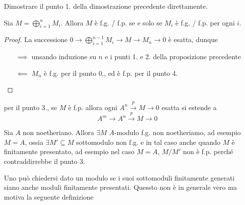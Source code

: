 \begin{eser}{}
    Dimostrare il punto 1. della dimostrazione precedente direttamente.
\end{eser}
\begin{corollary}{}
    Sia \(M = \bigoplus_{i=1}^{n} M_i \). Allora \(M\) è f.g. / f.p. se e solo
    se \(M_{i} \) è f.g. / f.p. per ogni \(i\).
\end{corollary}
\begin{proof}{}
    La successione \(0 \to \bigoplus_{i=1} ^{n-1}M_i \to M \to M_{n} \to 0\) è
    esatta, dunque
    \begin{itemize}
        \item[\(\implies \)] unsando induzione su \(n\) e i punti 1. e 2. della
            proposizione precedente
        \item[\(\impliedby \)] \(M_n\) è f.g. per il punto 0., ed è f.p. per il
            punto 4.
    \end{itemize}
\end{proof}
\begin{remark}{}
    per il punto 3., se \(M\) è f.p. allora ogni \(A^{n} \overset{p}{\to } M \to 0\) esatta si estende a 
    \[
      A^{m} \to A^{n} \overset{p}{\to } M \to 0
    \]
\end{remark}

\begin{remark}{}
    Sia \(A\) non noetheriano. Allora \(\exists M\) \(A\)-modulo f.g. non
    noetheriamo, ad esempio \(M = A\), ossia \(\exists  M' \subseteq M \)
    sottomodulo non f.g. e in tal caso anche quando \(M\) è finitamente
    presentato, ad esempio nel caso \(M=A\), \(M/M'\) non è f.p. perché
    contraddirrebbe il punto 3.
\end{remark}

Uno può chiedersi dato un modulo se i suoi sottomoduli finitamente generati
siano anche moduli finitamente presentati. Quessto non è in generale vero ma
motiva la seguente definizione

